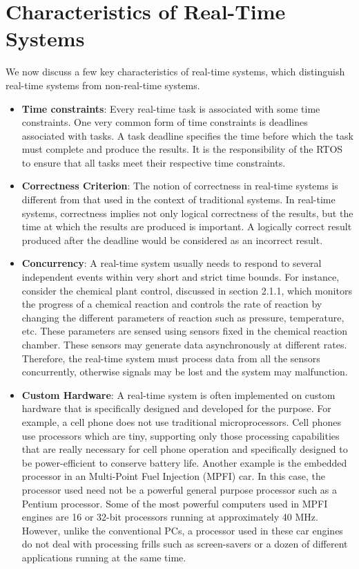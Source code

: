 \documentclass[12pt]{report}
\begin{document}
\section{Characteristics of Real-Time Systems}
We now discuss a few key characteristics of real-time systems, which distinguish real-time systems from non-real-time systems. 
\begin{itemize}
    \item \textbf{Time constraints}: Every real-time task is associated with some time constraints. One very common form of time constraints is deadlines associated with tasks. A task deadline specifies the time before which the task must complete and produce the results. It is the responsibility of the RTOS to ensure that all tasks meet their respective time constraints. 
    \item \textbf{Correctness Criterion}: The notion of correctness in real-time systems is different from that used in the context of traditional systems. In real-time systems, correctness implies not only logical correctness of the results, but the time at which the results are produced is important. A logically correct result produced after the deadline would be considered as an incorrect result. 
    \item \textbf{Concurrency}: A real-time system usually needs to respond to several independent events within very short and strict time bounds. For instance, consider the chemical plant control, discussed in section 2.1.1, which monitors the progress of a chemical reaction and controls the rate of reaction by changing the different parameters of reaction such as pressure, temperature, etc. These parameters are sensed using sensors fixed in the chemical reaction chamber. These sensors may generate data asynchronously at different rates. Therefore, the real-time system must process data from all the sensors concurrently, otherwise signals may be lost and the system may malfunction.
    \item \textbf{Custom Hardware}: A real-time system is often implemented on custom hardware that is specifically designed and developed for the purpose. For example, a cell phone does not use traditional microprocessors. Cell phones use processors which are tiny, supporting only those processing capabilities that are really necessary for cell phone operation and specifically designed to be power-efficient to conserve battery life. Another example is the embedded processor in an Multi-Point Fuel Injection (MPFI) car. In this case, the processor used need not be a powerful general purpose processor such as a Pentium processor. Some of the most powerful computers used in MPFI engines are 16 or 32-bit processors running at approximately 40 MHz. However, unlike the conventional PCs, a processor used in these car engines do not deal with processing frills such as screen-savers or a dozen of different applications running at the same time.

\end{itemize}
\end{document}

